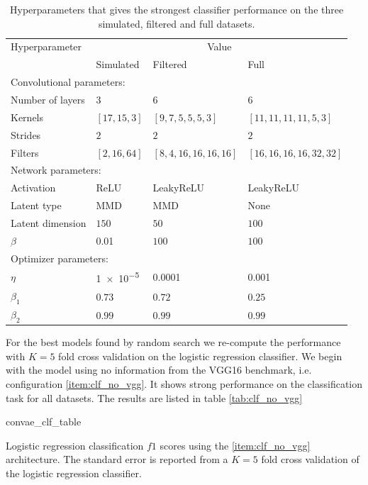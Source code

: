 \begin{table}
\centering
\setlength{\extrarowheight}{15pt}
\hspace*{-0.5in}
\begin{tabular}{llll}
\toprule
Hyperparameter & \multicolumn{3}{c}{Value} \\
& Simulated & Filtered & Full \\
\midrule
\multicolumn{4}{l}{Convolutional parameters: } \\
\midrule
Number of layers & 3 & 6 & 6\\
Kernels & $[17, 15, 3]$ & $[9, 7, 5, 5, 5, 3]$ & $[11, 11, 11, 11, 5, 3]$ \\
Strides & $2$ & $2$ & $2$ \\
Filters & $[2, 16, 64]$ & $[8, 4, 16, 16, 16, 16]$ & $[16, 16, 16, 16, 32, 32]$ \\ 
\midrule
\multicolumn{4}{l}{Network parameters: } \\
\midrule
Activation & ReLU & LeakyReLU & LeakyReLU \\
Latent type & MMD & MMD & None \\
Latent dimension & $150$ & $50$ & $100$ \\
$\beta$ & \num{0.01} & $100$ & $ 100$  \\
\midrule
\multicolumn{4}{l}{Optimizer parameters: } \\
\midrule
$\eta$ &  \num{1e-5} & \num{0.0001} & \num{0.001} \\
$\beta_1$ & $0.73$ & $0.72$ & $0.25$ \\
$\beta_2$ & $0.99$ & $0.99$ & $0.99$ \\
\bottomrule
\end{tabular}
\caption{Hyperparameters that gives the strongest classifier performance on the three simulated, filtered and full datasets.}\label{tab:best_params_clf_convae}
\end{table}

For the best models found by random search we re-compute the performance with $K=5$ fold cross validation on the logistic regression classifier. We begin with the model using no information from the VGG16 benchmark, i.e. configuration \ref{item:clf_no_vgg}. It shows strong performance on the classification task for all datasets. The results are listed in table \ref{tab:clf_no_vgg}

\begin{table}
\centering
{convae_clf_table}
\caption{Logistic regression classification $f1$ scores using the \ref{item:clf_no_vgg} architecture. The standard error is reported from a $K=5$ fold cross validation of the logistic regression classifier.}\label{tab:clf_no_vgg}
\end{table}

